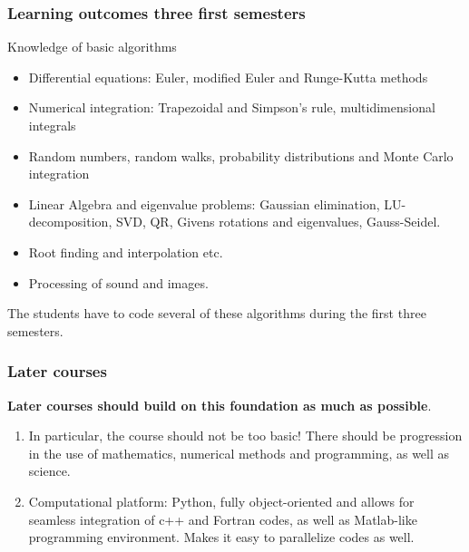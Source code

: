 \documentclass{beamer}
\begin{document}
\begin{frame}
\frametitle{Learning outcomes three first semesters}

\begin{block}{Knowledge of basic algorithms }

\begin{itemize}
\item Differential equations: Euler, modified Euler and Runge-Kutta methods

\item Numerical integration: Trapezoidal and Simpson's rule, multidimensional integrals

\item Random numbers, random walks, probability distributions and Monte Carlo integration

\item Linear Algebra and eigenvalue problems: Gaussian elimination, LU-decomposition, SVD, QR, Givens rotations and eigenvalues, Gauss-Seidel.

\item Root finding and interpolation etc.

\item Processing of sound and images.
\end{itemize}

\noindent
The students have to code several of these algorithms during the first three semesters.
\end{block}
\end{frame}

\begin{frame}
\frametitle{Later courses}

\begin{block}{}

\textbf{Later courses should build on this foundation as much as possible}.

\begin{enumerate}
\item In particular, the course should not be too basic! There should be progression in the use of mathematics, numerical methods and programming, as well as science.

\item Computational platform: Python, fully object-oriented and allows for seamless integration of c++ and Fortran codes, as well as Matlab-like programming environment. Makes it easy to parallelize codes as well.
\end{enumerate}

\noindent
\end{block}
\end{frame}
\end{document}
